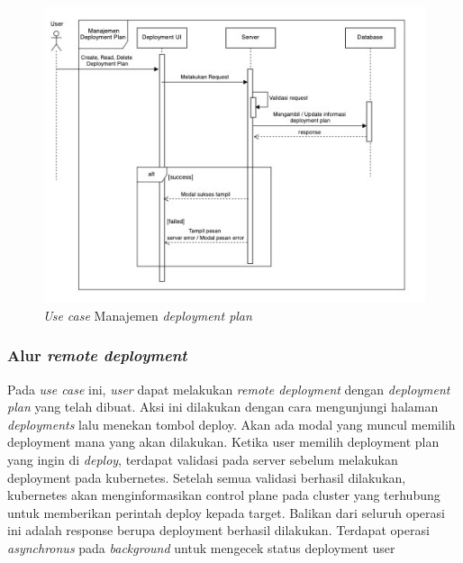 \begin{figure}[h]
  \centering
  \includegraphics[width=1\textwidth]{resources/chapter-3/usecase/uc-11.jpg}
  \caption{\textit{Use case} Manajemen \textit{deployment plan}}
  \label{fig:usecase-11}
\end{figure}

\pagebreak

\subsubsection{Alur \textit{remote deployment}}

Pada \textit{use case} ini, \textit{user} dapat melakukan \textit{remote deployment} dengan \textit{deployment plan} yang telah dibuat. Aksi ini dilakukan dengan cara mengunjungi halaman \textit{deployments} lalu menekan tombol deploy. Akan ada modal yang muncul memilih deployment mana yang akan dilakukan. Ketika user memilih deployment plan yang ingin di \textit{deploy}, terdapat validasi pada server sebelum melakukan deployment pada kubernetes. Setelah semua validasi berhasil dilakukan, kubernetes akan menginformasikan control plane pada cluster yang terhubung untuk memberikan perintah deploy kepada target. Balikan dari seluruh operasi ini adalah response berupa deployment berhasil dilakukan. Terdapat operasi \textit{asynchronus} pada \textit{background} untuk mengecek status deployment user


